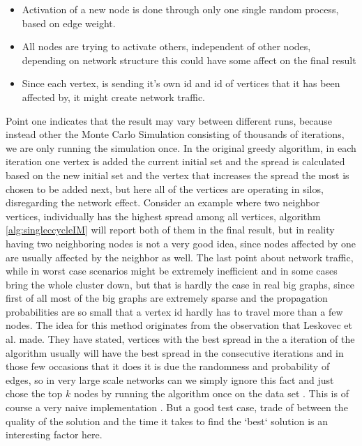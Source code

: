 \documentclass[english]{tktltiki}
\begin{document}
\begin{itemize}
\item Activation of a new node is done through only one single random process, based on edge weight.
\item All nodes are trying to activate others, independent of other nodes, depending on network structure this could have some affect on the final result
\item Since each vertex, is sending it's own id and id of vertices that it has been affected by, it might create network traffic.
\end{itemize}

Point one indicates that the result may vary between different runs, because instead other the Monte Carlo Simulation consisting of thousands of iterations, we are only running the simulation once. In the original greedy algorithm, in each iteration one vertex is added the current initial set and the spread is calculated based on the new initial set and the vertex that increases the spread the most is chosen to be added next, but here all of the vertices are operating in silos, disregarding the network effect. Consider an example where two neighbor vertices, individually has the highest spread among all vertices, algorithm \ref{alg:singleccycleIM} will report both of them in the final result, but in reality having two neighboring nodes is not a very good idea, since nodes affected by one are usually affected by the neighbor as well. The last point about network traffic, while in worst case scenarios might be extremely inefficient and in some cases bring the whole cluster down, but that is hardly the case in real big graphs, since first of all most of the big graphs are extremely sparse and the propagation probabilities are so small that a vertex id hardly has to travel more than a few nodes. The idea for this method originates from the observation that Leskovec et al. \cite{leskovec07} made. They have stated, vertices with the best spread in the a iteration of the algorithm usually will have the best spread in the consecutive iterations and in those few occasions that it does it is due the randomness and probability of edges, so in very large scale networks can we simply ignore this fact and just chose the top $k$ nodes by running the algorithm once on the data set . This is of course a very naive implementation . But a good test case, trade of between the quality of the solution and the time it takes to find the `best` solution is an interesting factor here. 
\end{document}
